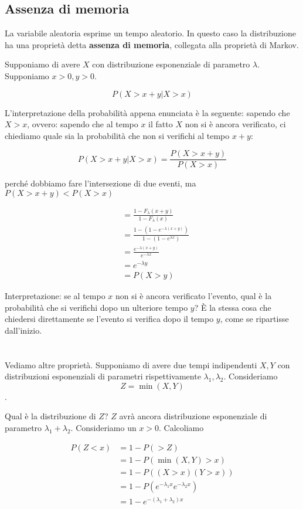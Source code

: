 \documentclass[a4paper,12pt]{book}
\begin{document}
\subsection{Assenza di memoria}

La variabile aleatoria esprime un tempo aleatorio. In questo caso la distribuzione ha una proprietà detta \textbf{assenza di memoria}, collegata alla proprietà di Markov. 

Supponiamo di avere $ X $ con distribuzione esponenziale di parametro $\lambda$. Supponiamo $ x > 0, y > 0 $.

$$ P(X > x + y | X > x) $$

L'interpretazione della probabilità appena enunciata è la seguente: sapendo che $ X > x $, ovvero: sapendo che al tempo $ x $ il fatto $ X $ non si è ancora verificato, ci chiediamo quale sia la probabilità che non si verifichi al tempo $ x+y $:

$$ P(X > x + y | X > x) = \frac{P(X>x+y)}{P(X > x)}$$

perché dobbiamo fare l'intersezione di due eventi, ma $ P(X>x+y) < P(X>x) $

\begin{align*}
	& = \frac{1 - F_\lambda (x+y)}{1-F_\lambda(x)} \\
	& = \frac{1- (1-e^{-\lambda(x+y)})}{1-(1-e^{\lambda x})} \\
	& = \frac{e^{-\lambda(x+y)}}{e^{-\lambda x}} \\
	& = e^{-\lambda y} \\
	& = P(X > y)
\end{align*}

Interpretazione: se al tempo $ x $ non si è ancora verificato l'evento, qual è la probabilità che si verifichi dopo un ulteriore tempo $ y $? È la stessa cosa che chiedersi direttamente se l'evento si verifica dopo il tempo $ y $, come se ripartisse dall'inizio. 
\\
\\
\\
Vediamo altre proprietà. Supponiamo di avere due tempi indipendenti $ X, Y $ con distribuzioni esponenziali di parametri rispettivamente $\lambda_1, \lambda_2$. Consideriamo
$$ Z = \min(X, Y) $$.

Qual è la distribuzione di $ Z $? $ Z $ avrà ancora distribuzione esponenziale di parametro $ \lambda_1 + \lambda_2 $. Consideriamo un $ x > 0 $. Calcoliamo

\begin{align*}
	P(Z < x) & = 1 - P( > Z) \\
	& = 1 - P(\min(X, Y) > x) \\
	& = 1 - P((X > x)(Y > x)) \\
	& = 1 - P(e^{-\lambda_1 x} e^{-\lambda_2 x}) \\
	& = 1 - e^{-(\lambda_1 + \lambda_2)x}
\end{align*}
\end{document}
